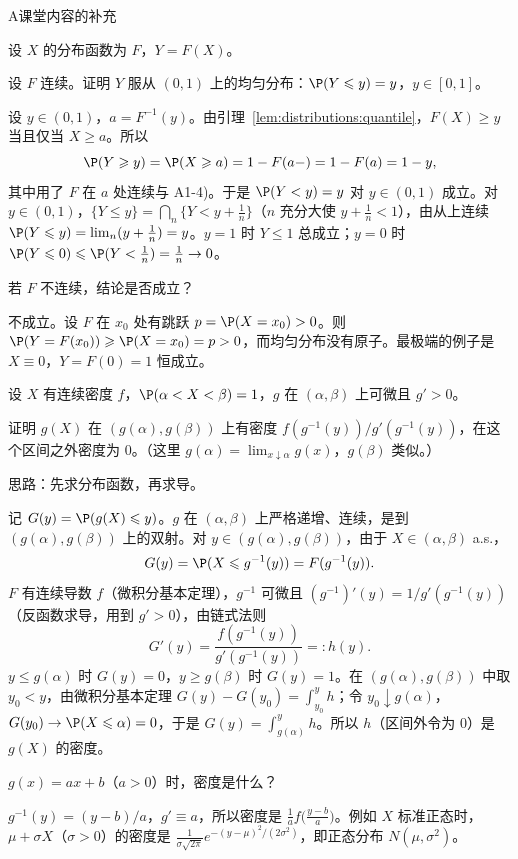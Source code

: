\begin{exercises}{A}{课堂内容的补充}
\item\label{ex:distributions:A2} 设 $X$ 的分布函数为 $F$，$Y=F(X)$。
\begin{questions}
\item 设 $F$ 连续。证明 $Y$ 服从 $(0,1)$ 上的均匀分布：$\P(Y\leqslant y)=y$，$y\in[0,1]$。
\begin{solution}
设 $y\in(0,1)$，$a=F^{-1}(y)$。由引理~\ref{lem:distributions:quantile}，$F(X)\geqslant y$ 当且仅当 $X\geqslant a$。所以
\[
\P(Y\geqslant y)=\P(X\geqslant a)=1-F(a-)=1-F(a)=1-y,
\]
其中用了 $F$ 在 $a$ 处连续与 A1-4)。于是 $\P(Y<y)=y$ 对 $y\in(0,1)$ 成立。对 $y\in(0,1)$，$\{Y\leqslant y\}=\bigcap_n\{Y<y+\frac1n\}$（$n$ 充分大使 $y+\frac1n<1$），由从上连续 $\P(Y\leqslant y)=\lim_n(y+\frac1n)=y$。$y=1$ 时 $Y\leqslant1$ 总成立；$y=0$ 时 $\P(Y\leqslant0)\leqslant \P(Y<\frac1n)=\frac1n\to0$。
\end{solution}
\item 若 $F$ 不连续，结论是否成立？
\begin{solution}
不成立。设 $F$ 在 $x_0$ 处有跳跃 $p=\P(X=x_0)>0$。则 $\P(Y=F(x_0))\geqslant \P(X=x_0)=p>0$，而均匀分布没有原子。最极端的例子是 $X\equiv0$，$Y=F(0)=1$ 恒成立。
\end{solution}
\end{questions}

\item\label{ex:distributions:A3} 设 $X$ 有连续密度 $f$，$\P(\alpha<X<\beta)=1$，$g$ 在 $(\alpha,\beta)$ 上可微且 $g'>0$。
\begin{questions}
\item 证明 $g(X)$ 在 $(g(\alpha),g(\beta))$ 上有密度 $f(g^{-1}(y))/g'(g^{-1}(y))$，在这个区间之外密度为 $0$。（这里 $g(\alpha)=\lim_{x\downarrow\alpha}g(x)$，$g(\beta)$ 类似。）
\begin{solution}
思路：先求分布函数，再求导。

记 $G(y)=\P(g(X)\leqslant y)$。$g$ 在 $(\alpha,\beta)$ 上严格递增、连续，是到 $(g(\alpha),g(\beta))$ 上的双射。对 $y\in(g(\alpha),g(\beta))$，由于 $X\in(\alpha,\beta)$ a.s.，
\[
G(y)=\P(X\leqslant g^{-1}(y))=F(g^{-1}(y)).
\]
$F$ 有连续导数 $f$（微积分基本定理），$g^{-1}$ 可微且 $(g^{-1})'(y)=1/g'(g^{-1}(y))$（反函数求导，用到 $g'>0$），由链式法则
\[
G'(y)=\frac{f(g^{-1}(y))}{g'(g^{-1}(y))}=:h(y).
\]
$y\leqslant g(\alpha)$ 时 $G(y)=0$，$y\geqslant g(\beta)$ 时 $G(y)=1$。在 $(g(\alpha),g(\beta))$ 中取 $y_0<y$，由微积分基本定理 $G(y)-G(y_0)=\int_{y_0}^yh$；令 $y_0\downarrow g(\alpha)$，$G(y_0)\to \P(X\leqslant\alpha)=0$，于是 $G(y)=\int_{g(\alpha)}^yh$。所以 $h$（区间外令为 $0$）是 $g(X)$ 的密度。
\end{solution}
\item $g(x)=ax+b$（$a>0$）时，密度是什么？
\begin{solution}
$g^{-1}(y)=(y-b)/a$，$g'\equiv a$，所以密度是 $\frac1af\bigl(\frac{y-b}a\bigr)$。例如 $X$ 标准正态时，$\mu+\sigma X$（$\sigma>0$）的密度是 $\frac1{\sigma\sqrt{2\pi}}e^{-(y-\mu)^2/(2\sigma^2)}$，即正态分布 $N(\mu,\sigma^2)$。
\end{solution}
\end{questions}


\end{exercises}
